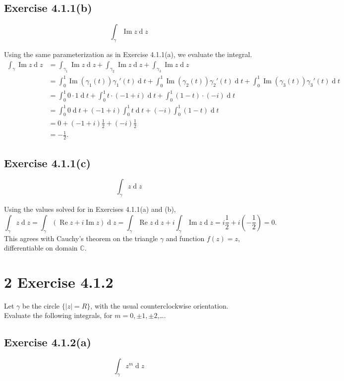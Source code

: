 \documentclass[12pt]{article}
\newenvironment{problem}
    {\begin{lrbox}{\mybox}\begin{minipage}{0.98\textwidth}}
    {\end{minipage}\end{lrbox}\framebox[\textwidth]{\usebox{\mybox}}}
\newcommand{\C}{\mathbb{C}} %
\newcommand{\<}{\left\langle} %
\renewcommand{\>}{\right\rangle} %
\renewcommand{\Im}{\operatorname{Im}} %
\renewcommand{\Re}{\operatorname{Re}} %
\renewcommand{\d}[1]{\operatorname{d}\!#1} %
\begin{document}
\newpage
\subsection*{Exercise 4.1.1(b)}
\begin{problem}
    \[\int_\gamma\Im z \d{z}\]
\end{problem}
\medskip

Using the same parameterization as in Exercise 4.1.1(a), we evaluate the integral.
\begin{align*}
    \int_\gamma\Im z \d{z}
        &= \int_{\gamma_1}\Im z \d{z} + \int_{\gamma_2}\Im z \d{z} + \int_{\gamma_3}\Im z \d{z} \\
        &= \int_0^1\Im(\gamma_1(t))\gamma_1'(t) \d{t} + \int_0^1\Im(\gamma_2(t))\gamma_2'(t) \d{t} + \int_0^1\Im(\gamma_3(t))\gamma_3'(t) \d{t} \\
        &= \int_0^1 0\cdot1 \d{t} + \int_0^1 t\cdot(-1+i)\d{t} + \int_0^1 (1-t)\cdot(-i)\d{t} \\
        &= \int_0^1 0 \d{t} + (-1+i)\int_0^1 t \d{t} + (-i)\int_0^1 (1-t) \d{t} \\
        &= 0 + (-1+i)\frac12 + (-i)\frac12 \\
        &= -\frac12.
\end{align*}

\subsection*{Exercise 4.1.1(c)}
\begin{problem}
    \[\int_\gamma z \d{z}\]
\end{problem}
\medskip

Using the values solved for in Exercises 4.1.1(a) and (b),
\[\int_\gamma z \d{z} = \int_\gamma (\Re z + i \Im z) \d{z} = \int_\gamma \Re z \d{z} + i\int_\gamma \Im z \d{z} = i\frac12 + i\left(-\frac12\right) = 0.\]
This agrees with Cauchy's theorem on the triangle $\gamma$ and function $f(z)=z$, differentiable on domain $\C$.

\newpage
\section*{2 Exercise 4.1.2}
\begin{problem}
    Let $\gamma$ be the circle $\{|z| = R\}$, with the usual counterclockwise orientation. Evaluate the following integrals, for $m=0,\pm1,\pm2$,\dots.
\end{problem}

\subsection*{Exercise 4.1.2(a)}
\begin{problem}
    \[\int_\gamma z^m \d{z}\]
\end{problem}
\medskip
\end{document}
